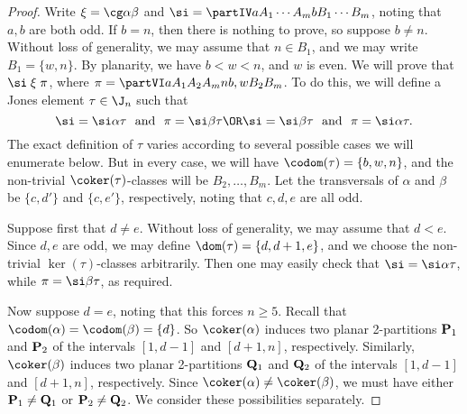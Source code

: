 \begin{proof} Write ${\mathrel\xi}=\cg\alpha\beta$ and $\si=\partIV
a{A_1}\cdots{A_m}b{B_1}\cdots{B_m}$, noting that $a,b$ are both odd.  If $b=n$, then there is nothing to prove,
so suppose $b\not=n$.  Without loss of generality, we may assume that $n\in B_1$, and we may write $B_1=\{w,n\}$.  By planarity, we have $b<w<n$, and $w$ is even.  
%
We will prove that $\si\mathrel\xi\pi$, where $\pi=\partVI a{A_1}{A_2}{A_m}n{b,w}{B_2}{B_m}$.
To do this, we will define a Jones element $\tau\in\J_n$ such that 
\begin{equation}\label{eq:bzn}
\si = \si\alpha\tau \ \ \text{and} \ \ \pi = \si\beta\tau
\OR
\si = \si\beta\tau \ \ \text{and} \ \  \pi = \si\alpha\tau.
\end{equation}
The exact definition of $\tau$ varies according to several possible cases we will enumerate below.  But in every case, we will have $\codom(\tau)=\{b,w,n\}$, and the non-trivial $\coker(\tau)$-classes will be $B_2,\ldots,B_m$.  
%
Let the transversals of $\alpha$ and $\beta$ be $\{c,d'\}$ and $\{c,e'\}$, respectively, noting that $c,d,e$ are all odd.  

\bigskip{}  Suppose first that $d\not=e$.  Without loss of generality, we may assume that $d<e$.  Since $d,e$ are odd, we may define $\dom(\tau)=\{d,d+1,e\}$, and we choose the non-trivial $\ker(\tau)$-classes arbitrarily.  
%
Then one may easily check that $\si=\si\alpha\tau$, while $\pi=\si\beta\tau$, as required.  

\bigskip{}  Now suppose $d=e$, noting that this forces $n\geq5$.  
%
Recall that $\codom(\alpha)=\codom(\beta)=\{d\}$.  So $\coker(\alpha)$ induces two planar 2-partitions ${\bf P}_1$ and ${\bf P}_2$ of the intervals $[1,d-1]$ and $[d+1,n]$, respectively.  Similarly, $\coker(\beta)$ induces two planar 2-partitions ${\bf Q}_1$ and ${\bf Q}_2$ of the intervals $[1,d-1]$ and $[d+1,n]$, respectively.  Since $\coker(\alpha)\not=\coker(\beta)$, we must have either ${\bf P}_1\not={\bf Q}_1$ or ${\bf P}_2\not={\bf Q}_2$.  We consider these possibilities separately.


\end{proof}
